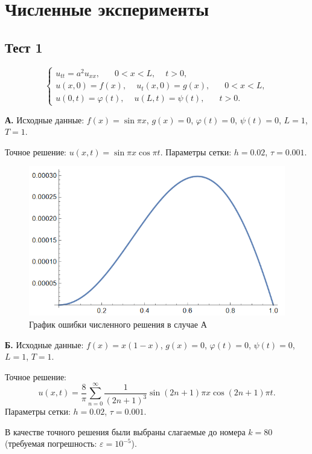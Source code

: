 \documentclass[12pt, a4paper]{article}
\begin{document}
	\section{Численные эксперименты}
	
	\subsection{Тест 1}
	\[
	\begin{cases}
		u_{tt} = a^2 u_{xx}, \phantom{xxx} 0<x<L, \phantom{xx} t>0, \\
		u(x,0) = f(x), \phantom{xx} u_t(x,0) = g(x), \phantom{xxx} 0<x<L,\\
		u(0,t) = \varphi(t), \phantom{xx} u(L,t) =\psi(t), \phantom{xxx} t>0.
	\end{cases}
	\]
	
	\textbf{А.} Исходные данные: $f(x)=\sin\pi x$, $g(x)=0$, $\varphi(t)=0$, $\psi(t)=0$, $L=1$, $T= 1$.
	
	Точное решение: $u(x,t) = \sin \pi x \cos \pi t$. Параметры сетки: $h=0.02$, $\tau=0.001$.
	
	\begin{figure}[H]
		\centering
		\includegraphics[width=1\textwidth]{errors1}
		\caption{График ошибки численного решения в случае А}
	\end{figure}

	\textbf{Б.} Исходные данные: $f(x)=x(1-x)$, $g(x)=0$, $\varphi(t)=0$, $\psi(t)=0$, $L=1$, $T= 1$.
	
	Точное решение:
	\[
	u(x,t) = \dfrac8\pi \sum_{n=0}^{\infty} \dfrac{1}{(2n+1)^3}\sin(2n+1)\pi x \cos(2n+1)\pi t.
	\]
	 Параметры сетки: $h=0.02$, $\tau=0.001$.
	 
	В качестве точного решения были выбраны слагаемые до номера $k=80$ (требуемая погрешность: $\varepsilon = 10^{-5}$).
	
\end{document}
